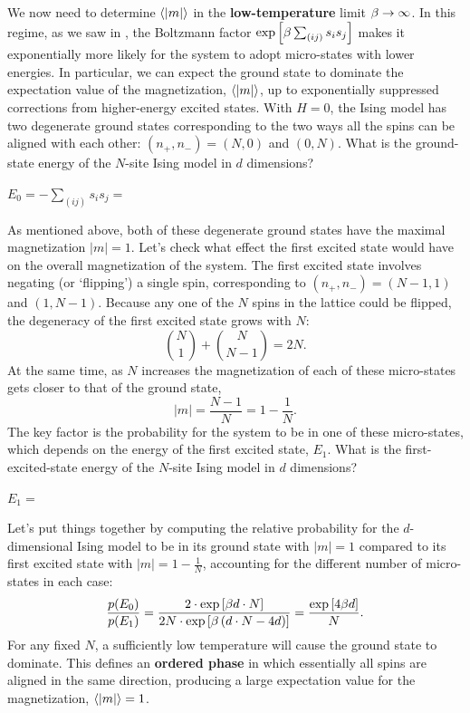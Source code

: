 We now need to determine $\left\langle |m| \right\rangle$ in the \textbf{low-temperature} limit $\beta \to \infty$.
In this regime, as we saw in , the Boltzmann factor $\exp\left[\beta\sum_{(ij)} s_i s_j\right]$ makes it exponentially more likely for the system to adopt micro-states with lower energies.
In particular, we can expect the ground state to dominate the expectation value of the magnetization, $\left\langle |m| \right\rangle$, up to exponentially suppressed corrections from higher-energy excited states.
With $H = 0$, the Ising model has two degenerate ground states corresponding to the two ways all the spins can be aligned with each other: $(n_+, n_-) = (N, 0)$ and $(0, N)$.
What is the ground-state energy of the $N$-site Ising model in $d$ dimensions?
\begin{mdframed}
  $\displaystyle E_0 = -\sum_{(ij)} s_i s_j = $ \\[50 pt]
\end{mdframed}

As mentioned above, both of these degenerate ground states have the maximal magnetization $|m| = 1$.
Let's check what effect the first excited state would have on the overall magnetization of the system.
The first excited state involves negating (or `flipping') a single spin, corresponding to $(n_+, n_-) = (N - 1, 1)$ and $(1, N - 1)$.
Because any one of the $N$ spins in the lattice could be flipped, the degeneracy of the first excited state grows with $N$:
\begin{equation*}
  \binom{N}{1} + \binom{N}{N - 1} = 2N.
\end{equation*}
At the same time, as $N$ increases the magnetization of each of these micro-states gets closer to that of the ground state,
\begin{equation*}
  |m| = \frac{N - 1}{N} = 1 - \frac{1}{N}.
\end{equation*}
The key factor is the probability for the system to be in one of these micro-states, which depends on the energy of the first excited state, $E_1$.
What is the first-excited-state energy of the $N$-site Ising model in $d$ dimensions?
\begin{mdframed}
  $\displaystyle E_1 = $ \\[100 pt]
\end{mdframed}

Let's put things together by computing the relative probability for the $d$-dimensional Ising model to be in its ground state with $|m| = 1$ compared to its first excited state with $|m| = 1 - \frac{1}{N}$, accounting for the different number of micro-states in each case:
\begin{equation*}
  \frac{p(E_0)}{p(E_1)} = \frac{2\cdot \exp\left[\beta d\cdot N\right]}{2N\cdot \exp\left[\beta \left(d\cdot N - 4d\right)\right]} = \frac{\exp\left[4\beta d\right]}{N}.
\end{equation*}
For any fixed $N$, a sufficiently low temperature will cause the ground state to dominate.
This defines an \textbf{ordered phase} in which essentially all spins are aligned in the same direction, producing a large expectation value for the magnetization, $\left\langle |m| \right\rangle = 1$.

